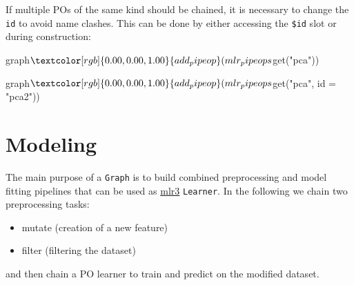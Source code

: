 \documentclass[
  11pt,
  parskip=half,
  DIV=calc,
  BCOR=10mm,
  x11names]{scrbook}
\newenvironment{Shaded}{}{}
\newcommand{\DataTypeTok}[1]{#1}
\newcommand{\KeywordTok}[1]{\textcolor[rgb]{0.00,0.00,1.00}{#1}}
\newcommand{\NormalTok}[1]{#1}
\newcommand{\OperatorTok}[1]{#1}
\newcommand{\StringTok}[1]{\textcolor[rgb]{0.00,0.50,0.50}{#1}}
\providecommand{\tightlist}{%
  \setlength{\itemsep}{0pt}\setlength{\parskip}{0pt}}
\begin{document}
If multiple POs of the same kind should be chained, it is necessary to change the \texttt{id} to avoid name clashes.
This can be done by either accessing the \texttt{\$id} slot or during construction:

\begin{Shaded}
\begin{Highlighting}[]
\NormalTok{graph}\OperatorTok{$}\KeywordTok{add_pipeop}\NormalTok{(mlr_pipeops}\OperatorTok{$}\KeywordTok{get}\NormalTok{(}\StringTok{"pca"}\NormalTok{))}
\end{Highlighting}
\end{Shaded}

\begin{Shaded}
\begin{Highlighting}[]
\NormalTok{graph}\OperatorTok{$}\KeywordTok{add_pipeop}\NormalTok{(mlr_pipeops}\OperatorTok{$}\KeywordTok{get}\NormalTok{(}\StringTok{"pca"}\NormalTok{, }\DataTypeTok{id =} \StringTok{"pca2"}\NormalTok{))}
\end{Highlighting}
\end{Shaded}

\hypertarget{pipe-modeling}{%
\section{Modeling}\label{pipe-modeling}}

The main purpose of a \texttt{Graph} is to build combined preprocessing and model fitting pipelines that can be used as \href{https://mlr3.mlr-org.com}{mlr3} \texttt{Learner}.
In the following we chain two preprocessing tasks:

\begin{itemize}
\tightlist
\item
  mutate (creation of a new feature)
\item
  filter (filtering the dataset)
\end{itemize}

and then chain a PO learner to train and predict on the modified dataset.

\begin{Shaded}
\end{Shaded}
\end{document}
